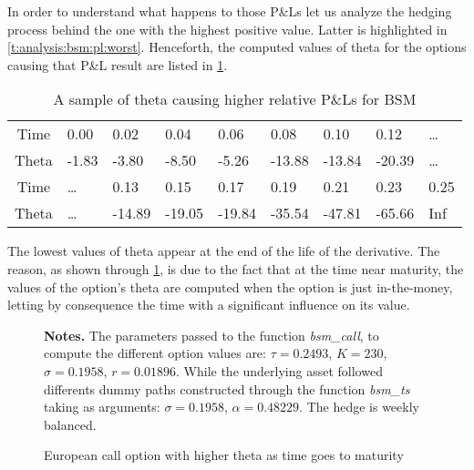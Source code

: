 \documentclass[12pt,a4paper]{report}
\begin{document}
In order to understand what happens to those P\&Ls let us analyze the hedging process behind the one with the highest positive value. Latter is highlighted in \cref{t:analysis:bsm:pl:worst}.
Henceforth, the computed values of theta for the options causing that P\&L result are listed in \cref{t:analysis:bsm:pl:worst:theta}.

 
\begin{table}[h]
\centering
\begin{tabular}{c|llllllll}
  \hline
  \hline
  Time & 0.00 & 0.02 & 0.04 & 0.06 & 0.08 & 0.10 & 0.12 & \ldots\\ 
Theta & -1.83 & -3.80 & -8.50 & -5.26 & -13.88 & -13.84 & -20.39 & \ldots \\ 
   \hdashline
  Time & \ldots & 0.13 & 0.15 & 0.17 & 0.19 & 0.21 & 0.23 & 0.25 \\ 
  Theta & \ldots & -14.89 & -19.05 & -19.84 & -35.54 & -47.81 & -65.66 & Inf \\ 
   \hline
\end{tabular}
\caption{A sample of theta causing higher relative P\&Ls for BSM} 
\label{t:analysis:bsm:pl:worst:theta}
\end{table}



The lowest values of theta appear at the end of the life of the derivative. 
The reason, as shown through \cref{p:analysis:gbm:pl:theta:high},  is due to the fact that at the time near maturity, the values of the option's theta are computed when the option is just in-the-money, letting by consequence the time with a significant influence on its value.


\begin{figure}[h]
  \centering
  
  \caption{European call option with higher theta as time goes to maturity}
  \begin{changemargin}{0.5cm}{0.5cm}
  \medskip
\footnotesize
{}\textbf{Notes.} The parameters passed to the function \textit{bsm\_call}, to compute the different option values are: $\tau = 0.2493$, $K = 230$, $\sigma = 0.1958$, $r = 0.01896$. While the underlying asset followed differents dummy paths constructed through the function \textit{bsm\_ts} taking as arguments: $\sigma = 0.1958$, $\alpha = 0.48229$. The hedge is weekly balanced.
  \end{changemargin}
  \label{p:analysis:gbm:pl:theta:high}
\end{figure}
\end{document}
